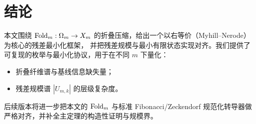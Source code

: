 \section{结论}

本文围绕 $\mathrm{Fold}_m:\Omega_m\to X_m$ 的折叠压缩，给出一个以右等价（Myhill--Nerode）为核心的残差最小化框架，
并把残差规模与最小有限状态实现对齐。我们提供了可复现的枚举与最小化协议，用于在不同 $m$ 下量化：
\begin{itemize}
  \item 折叠纤维谱与基线信息缺失量；
  \item 残差规模谱 $|U_{m,k}|$ 的层级复杂度。
\end{itemize}
后续版本将进一步把本文的 $\mathrm{Fold}_m$ 与标准 Fibonacci/Zeckendorf 规范化转导器做严格对齐，并补全主定理的构造性证明与规模界。

